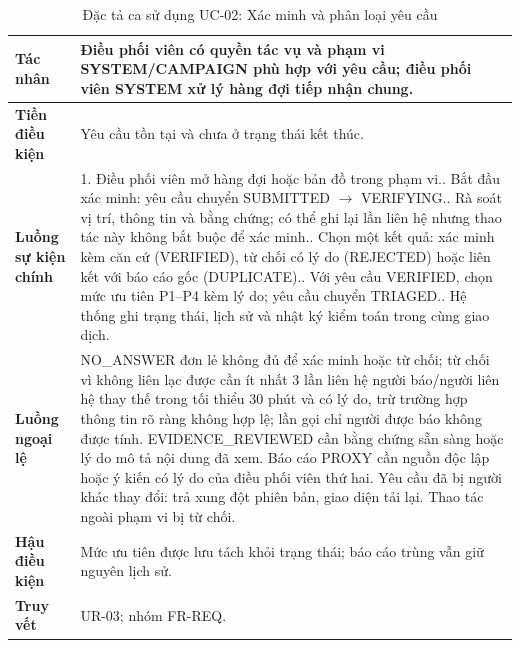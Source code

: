\documentclass[12pt,a4paper,oneside]{report}
\begin{document}
\begin{table}[H]
  \centering
  \caption{Đặc tả ca sử dụng UC-02: Xác minh và phân loại yêu cầu}\label{tab:uc02-spec}
  \small
  \begin{tabularx}{\textwidth}{|L{3.0cm}|Y|}
    \hline
    \textbf{Tác nhân} & Điều phối viên có quyền tác vụ và phạm vi SYSTEM/CAMPAIGN phù hợp với yêu cầu; điều phối viên SYSTEM xử lý hàng đợi tiếp nhận chung. \\
    \hline
    \textbf{Tiền điều kiện} & Yêu cầu tồn tại và chưa ở trạng thái kết thúc. \\
    \hline
    \textbf{Luồng sự kiện chính} & 1. Điều phối viên mở hàng đợi hoặc bản đồ trong phạm vi.. Bắt đầu xác minh: yêu cầu chuyển SUBMITTED $\rightarrow$ VERIFYING.. Rà soát vị trí, thông tin và bằng chứng; có thể ghi lại lần liên hệ nhưng thao tác này không bắt buộc để xác minh.. Chọn một kết quả: xác minh kèm căn cứ (VERIFIED), từ chối có lý do (REJECTED) hoặc liên kết với báo cáo gốc (DUPLICATE).. Với yêu cầu VERIFIED, chọn mức ưu tiên P1–P4 kèm lý do; yêu cầu chuyển TRIAGED.. Hệ thống ghi trạng thái, lịch sử và nhật ký kiểm toán trong cùng giao dịch. \\
    \hline
    \textbf{Luồng ngoại lệ} & NO\_ANSWER đơn lẻ không đủ để xác minh hoặc từ chối; từ chối vì không liên lạc được cần ít nhất 3 lần liên hệ người báo/người liên hệ thay thế trong tối thiểu 30 phút và có lý do, trừ trường hợp thông tin rõ ràng không hợp lệ; lần gọi chỉ người được báo không được tính. EVIDENCE\_REVIEWED cần bằng chứng sẵn sàng hoặc lý do mô tả nội dung đã xem. Báo cáo PROXY cần nguồn độc lập hoặc ý kiến có lý do của điều phối viên thứ hai. Yêu cầu đã bị người khác thay đổi: trả xung đột phiên bản, giao diện tải lại. Thao tác ngoài phạm vi bị từ chối. \\
    \hline
    \textbf{Hậu điều kiện} & Mức ưu tiên được lưu tách khỏi trạng thái; báo cáo trùng vẫn giữ nguyên lịch sử. \\
    \hline
    \textbf{Truy vết} & UR-03; nhóm FR-REQ. \\
    \hline
  \end{tabularx}
\end{table}
\end{document}
